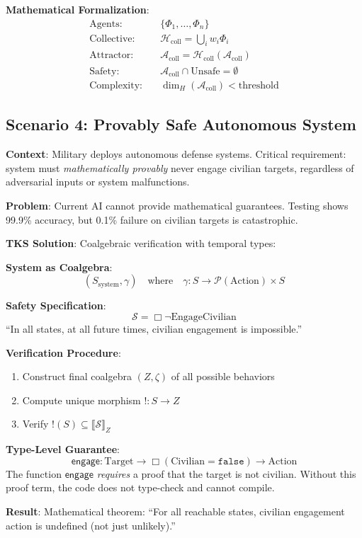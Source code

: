 \documentclass[11pt,twoside]{article}
\theoremstyle{definition}
\theoremstyle{plain}
\theoremstyle{remark}
\newcommand{\sem}[1]{\llbracket #1 \rrbracket}
\newcommand{\Frac}{\Phi}
\newcommand{\CollHutch}{\mathcal{H}_{\mathrm{coll}}}
\newcommand{\SafetySpec}{\mathcal{S}}
\begin{document}
\textbf{Mathematical Formalization}:
\begin{equation}
\boxed{
\begin{aligned}
\text{Agents}: & \quad \{\Frac_1, \ldots, \Frac_n\} \\
\text{Collective}: & \quad \CollHutch = \bigcup_i w_i \Frac_i \\
\text{Attractor}: & \quad \mathcal{A}_{\mathrm{coll}} = \CollHutch(\mathcal{A}_{\mathrm{coll}}) \\
\text{Safety}: & \quad \mathcal{A}_{\mathrm{coll}} \cap \text{Unsafe} = \emptyset \\
\text{Complexity}: & \quad \dim_H(\mathcal{A}_{\mathrm{coll}}) < \text{threshold}
\end{aligned}
}
\end{equation}

\subsection{Scenario 4: Provably Safe Autonomous System}

\begin{tcolorbox}[colback=yellow!10!white,colframe=orange!75!black,title=\textbf{Scenario: Autonomous Weapons Constraint}]
\textbf{Context}: Military deploys autonomous defense systems. Critical requirement:
system must \emph{mathematically provably} never engage civilian targets, regardless
of adversarial inputs or system malfunctions.

\textbf{Problem}: Current AI cannot provide mathematical guarantees. Testing shows
99.9\% accuracy, but 0.1\% failure on civilian targets is catastrophic.

\textbf{TKS Solution}: Coalgebraic verification with temporal types:

\textbf{System as Coalgebra}:
\[
(S_{\mathrm{system}}, \gamma) \quad \text{where} \quad \gamma : S \to \mathcal{P}(\text{Action}) \times S
\]

\textbf{Safety Specification}:
\[
\SafetySpec = \Box \neg \text{EngageCivilian}
\]
``In all states, at all future times, civilian engagement is impossible.''

\textbf{Verification Procedure}:
\begin{enumerate}
  \item Construct final coalgebra $(Z, \zeta)$ of all possible behaviors
  \item Compute unique morphism $! : S \to Z$
  \item Verify $!(S) \subseteq \sem{\SafetySpec}_Z$
\end{enumerate}

\textbf{Type-Level Guarantee}:
\[
\mathsf{engage} : \text{Target} \to \Box(\text{Civilian} = \mathtt{false}) \to \text{Action}
\]
The function $\mathsf{engage}$ \emph{requires} a proof that the target is not civilian.
Without this proof term, the code does not type-check and cannot compile.

\textbf{Result}: Mathematical theorem: ``For all reachable states, civilian
engagement action is undefined (not just unlikely).''
\end{tcolorbox}
\end{document}
